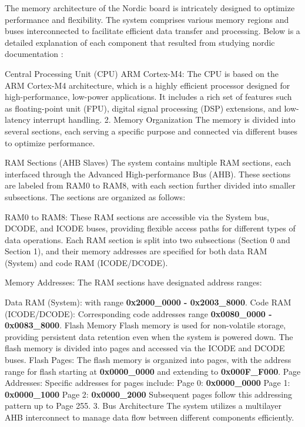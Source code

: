 \documentclass{Configuration_Files/PoliMi3i_thesis}
\begin{document}
The memory architecture of the Nordic board is intricately designed to optimize performance and flexibility. The system comprises various memory regions and buses interconnected to facilitate efficient data transfer and processing. Below is a detailed explanation of each component that resulted from studying nordic documentation \cite{NordicSemiconductorInfocenter}:

Central Processing Unit (CPU) ARM Cortex-M4: The CPU is based on the ARM Cortex-M4 architecture, which is a highly efficient processor designed for high-performance, low-power applications. It includes a rich set of features such as floating-point unit (FPU), digital signal processing (DSP) extensions, and low-latency interrupt handling.
2. Memory Organization
The memory is divided into several sections, each serving a specific purpose and connected via different buses to optimize performance.

RAM Sections (AHB Slaves)
The system contains multiple RAM sections, each interfaced through the Advanced High-performance Bus (AHB). These sections are labeled from RAM0 to RAM8, with each section further divided into smaller subsections. The sections are organized as follows:

RAM0 to RAM8: These RAM sections are accessible via the System bus, DCODE, and ICODE buses, providing flexible access paths for different types of data operations. Each RAM section is split into two subsections (Section 0 and Section 1), and their memory addresses are specified for both data RAM (System) and code RAM (ICODE/DCODE).

Memory Addresses: The RAM sections have designated address ranges:

Data RAM (System): with range \textbf{0x2000\_0000 - 0x2003\_8000}.
Code RAM (ICODE/DCODE): Corresponding code addresses range \textbf{0x0080\_0000 - 0x0083\_8000}.
Flash Memory
Flash memory is used for non-volatile storage, providing persistent data retention even when the system is powered down. The flash memory is divided into pages and accessed via the ICODE and DCODE buses.
Flash Pages: The flash memory is organized into pages, with the address range for flash starting at \textbf{0x0000\_0000} and extending to \textbf{0x000F\_F000}.
Page Addresses: Specific addresses for pages include:
Page 0: \textbf{0x0000\_0000}
Page 1: \textbf{0x0000\_1000}
Page 2: \textbf{0x0000\_2000}
Subsequent pages follow this addressing pattern up to Page 255.
3. Bus Architecture
The system utilizes a multilayer AHB interconnect to manage data flow between different components efficiently.
\end{document}
